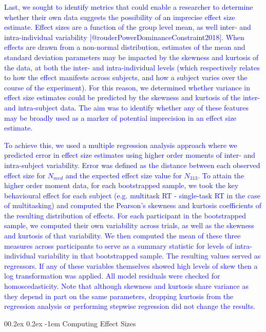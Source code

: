 \documentclass[
  man]{apa6}
\makeatletter
\let\oldparagraph\paragraph
\renewcommand{\paragraph}[1]{\oldparagraph{#1}\mbox{}}
\renewcommand{\paragraph}{\@startsection{paragraph}{4}{\parindent}%
  {0\baselineskip \@plus 0.2ex \@minus 0.2ex}%
  {-1em}%
  {\normalfont\normalsize\bfseries\itshape\typesectitle}}
\makeatother
\begin{document}
\textcolor{blue}{Last, we sought to identify metrics that could enable a researcher to determine whether their own data suggests the possibility of an imprecise effect size estimate. Effect sizes are a function of the group level mean, as well inter- and intra-individual variability [@rouderPowerDominanceConstraint2018]. When effects are drawn from a non-normal distribution, estimates of the mean and standard deviation parameters may be impacted by the skewness and kurtosis of the data, at both the inter- and intra-individual levels (which respectively relates to how the effect manifests across subjects, and how a subject varies over the course of the experiment). For this reason, we determined whether variance in effect size estimates could be predicted by the skewness and kurtosis of the inter-and intra-subject data. The aim was to identify whether any of these features may be broadly used as a marker of potential imprecision in an effect size estimate.}

\textcolor{blue}{To achieve this, we used a multiple regression analysis approach where we predicted error in effect size estimates using higher order moments of inter- and intra-subject variability. Error was defined as the distance between each observed effect size for $N_{med}$ and the expected effect size value for $N_{313}$. To attain the higher order moment data, for each bootstrapped sample, we took the key behavioural effect for each subject (e.g. multitask RT - single-task RT in the case of multitasking) and computed the Pearson's skewness and kurtosis coefficients of the resulting distribution of effects. For each participant in the bootstrapped sample, we computed their own variability across trials, as well as the skewness and kurtosis of that variability. We then computed the mean of these three measures across participants to serve as a summary statistic for levels of intra-individual variability in that bootstrapped sample. The resulting values served as regressors. If any of these variables themselves showed high levels of skew then a log transformation was applied. All model residuals were checked for homoscedasticity. Note that although skewness and kurtosis share variance as they depend in part on the same parameters, dropping kurtosis from the regression analysis or performing stepwise regression did not change the results.}

\hypertarget{computing-effect-sizes}{%
\paragraph{Computing Effect Sizes}\label{computing-effect-sizes}}
\end{document}
